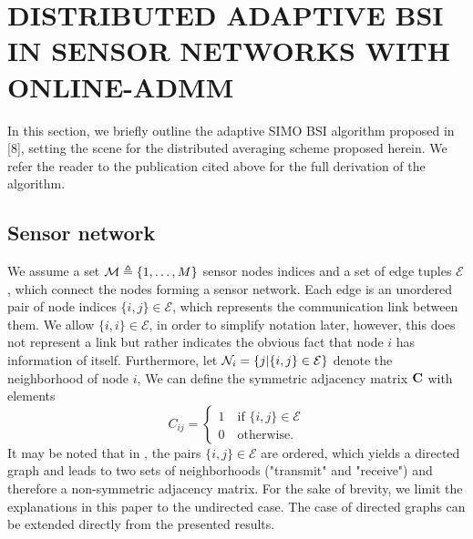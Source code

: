 \documentclass{article}
\begin{document}
\section{DISTRIBUTED ADAPTIVE BSI IN SENSOR NETWORKS WITH ONLINE-ADMM}
\label{sec:dbsi}
In this section, we briefly outline the adaptive SIMO BSI algorithm proposed in [8], setting the scene for the distributed averaging scheme proposed herein.
We refer the reader to the publication cited above for the full derivation of the algorithm.

\subsection[]{Sensor network}
We assume a set \(\mathcal{M} \triangleq \{1,\ldots,M\}\) sensor nodes indices and a set of edge tuples \(\mathcal{E}\), which connect the nodes forming a sensor network.
Each edge is an unordered pair of node indices \(\{i,j\} \in \mathcal{E}\), which represents the communication link between them.
We allow \(\{i,i\} \in \mathcal{E}\), in order to simplify notation later, however, this does not represent a link but rather indicates the obvious fact that node \(i\) has information of itself.
Furthermore, let \(\mathcal{N}_i = \{j|\{i,j\} \in \mathcal{E}\}\) denote the neighborhood of node \(i\),
We can define the symmetric adjacency matrix \(\bm{\mathrm{C}}\) with elements
\begin{equation}
    C_{ij} = \begin{cases}
        1 \quad \text{if } \{i,j\} \in \mathcal{E}\\
        0 \quad \text{otherwise}.
    \end{cases}
\end{equation}
It may be noted that in \cite{blochbergerDBSI}, the pairs \(\{i,j\} \in \mathcal{E}\) are ordered, which yields a directed graph and leads to two sets of neighborhoods ("transmit" and "receive") and therefore a non-symmetric adjacency matrix.
For the sake of brevity, we limit the explanations in this paper to the undirected case.
The case of directed graphs can be extended directly from the presented results.
\end{document}
